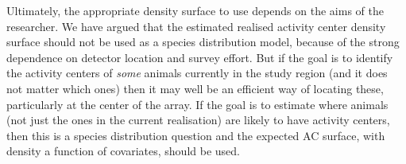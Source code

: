 \documentclass[useAMS,usenatbib,referee]{biom}
\begin{document}

Ultimately, the appropriate density surface to use depends on the aims of the researcher. We have argued that the estimated realised activity center density surface should not be used as a species distribution model, because of the strong dependence on detector location and survey effort. But if the goal is to identify the activity centers of {\it some} animals currently in the study region (and it does not matter which ones) then it may well be an efficient way of locating these, particularly at the center of the array. %
If the goal is to estimate where animals (not just the ones in the current realisation) are likely to have activity centers, then this is a species distribution question and the expected AC surface, with density a function of covariates, should be used.
\end{document}
